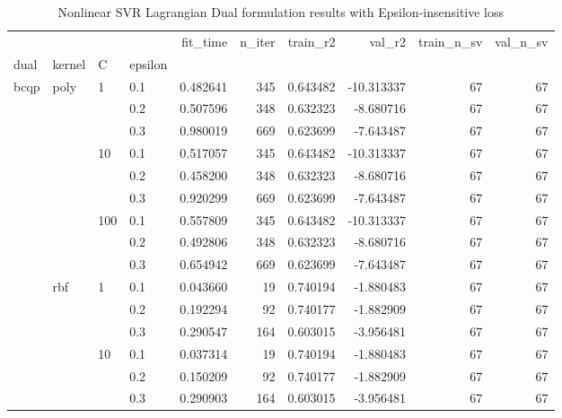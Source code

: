 \begin{table}[H]
\centering
\caption{Nonlinear SVR Lagrangian Dual formulation results with Epsilon-insensitive loss}
\label{nonlinear_lagrangian_dual_svr_cv_results}
\begin{tabular}{llllrrrrrr}
\toprule
   &     &     &     &  fit\_time &  n\_iter &  train\_r2 &     val\_r2 &  train\_n\_sv &  val\_n\_sv \\
dual & kernel & C & epsilon &           &         &           &            &             &           \\
\midrule
bcqp & poly & 1   & 0.1 &  0.482641 &     345 &  0.643482 & -10.313337 &          67 &        67 \\
   &     &     & 0.2 &  0.507596 &     348 &  0.632323 &  -8.680716 &          67 &        67 \\
   &     &     & 0.3 &  0.980019 &     669 &  0.623699 &  -7.643487 &          67 &        67 \\
   &     & 10  & 0.1 &  0.517057 &     345 &  0.643482 & -10.313337 &          67 &        67 \\
   &     &     & 0.2 &  0.458200 &     348 &  0.632323 &  -8.680716 &          67 &        67 \\
   &     &     & 0.3 &  0.920299 &     669 &  0.623699 &  -7.643487 &          67 &        67 \\
   &     & 100 & 0.1 &  0.557809 &     345 &  0.643482 & -10.313337 &          67 &        67 \\
   &     &     & 0.2 &  0.492806 &     348 &  0.632323 &  -8.680716 &          67 &        67 \\
   &     &     & 0.3 &  0.654942 &     669 &  0.623699 &  -7.643487 &          67 &        67 \\
   & rbf & 1   & 0.1 &  0.043660 &      19 &  0.740194 &  -1.880483 &          67 &        67 \\
   &     &     & 0.2 &  0.192294 &      92 &  0.740177 &  -1.882909 &          67 &        67 \\
   &     &     & 0.3 &  0.290547 &     164 &  0.603015 &  -3.956481 &          67 &        67 \\
   &     & 10  & 0.1 &  0.037314 &      19 &  0.740194 &  -1.880483 &          67 &        67 \\
   &     &     & 0.2 &  0.150209 &      92 &  0.740177 &  -1.882909 &          67 &        67 \\
   &     &     & 0.3 &  0.290903 &     164 &  0.603015 &  -3.956481 &          67 &        67 \\

\end{tabular}
\end{table}
